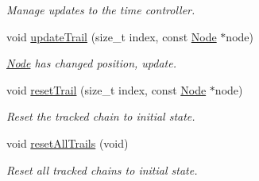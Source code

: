 \begin{DoxyCompactItemize}
\begin{DoxyCompactList}\small\item\em Manage updates to the time controller. \end{DoxyCompactList}\item 
\mbox{\label{classPURibbonTrail_a0cc8552c45972e4d612177321e7dfd1b}} 
void \hyperlink{classPURibbonTrail_a0cc8552c45972e4d612177321e7dfd1b}{update\+Trail} (size\+\_\+t index, const \hyperlink{classNode}{Node} $\ast$node)
\begin{DoxyCompactList}\small\item\em \hyperlink{classNode}{Node} has changed position, update. \end{DoxyCompactList}\item 
\mbox{\label{classPURibbonTrail_adb8130d276a73559b0abc864af60dc64}} 
void \hyperlink{classPURibbonTrail_adb8130d276a73559b0abc864af60dc64}{reset\+Trail} (size\+\_\+t index, const \hyperlink{classNode}{Node} $\ast$node)
\begin{DoxyCompactList}\small\item\em Reset the tracked chain to initial state. \end{DoxyCompactList}\item 
\mbox{\label{classPURibbonTrail_a3fd6b55cc4412cad9ab41586c2af9986}} 
void \hyperlink{classPURibbonTrail_a3fd6b55cc4412cad9ab41586c2af9986}{reset\+All\+Trails} (void)
\begin{DoxyCompactList}\small\item\em Reset all tracked chains to initial state. \end{DoxyCompactList}\end{DoxyCompactItemize}

